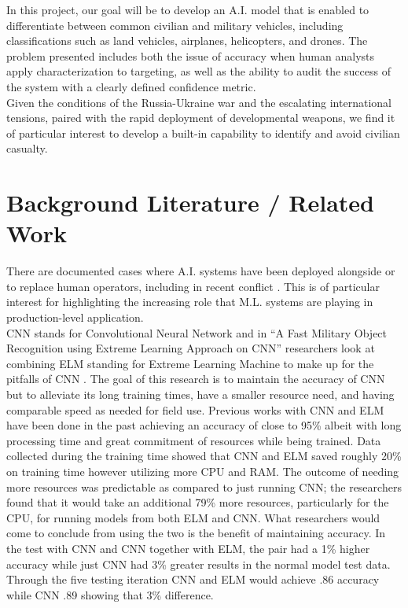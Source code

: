 \documentclass[12pt,twoside]{article}
\begin{document}
In this project, our goal will be to develop an A.I. model that is enabled to differentiate between common civilian and military vehicles, including classifications such as land vehicles, airplanes, helicopters, and drones. The problem presented includes both the issue of accuracy when human analysts apply characterization to targeting, as well as the ability to audit the success of the system with a clearly defined confidence metric.\\

Given the conditions of the Russia-Ukraine war and the escalating international tensions, paired with the rapid deployment of developmental weapons, we find it of particular interest to develop a built-in capability to identify and avoid civilian casualty. 

\newpage
\section{Background Literature / Related Work}
There are documented cases where A.I. systems have been deployed alongside or to replace human operators, including in recent conflict \cite{dronesAI}. This is of particular interest for highlighting the increasing role that M.L. systems are playing in production-level application.\\

CNN stands for Convolutional Neural Network and in ``A Fast Military Object Recognition using Extreme Learning Approach on CNN'' researchers look at combining ELM standing for Extreme Learning Machine to make up for the pitfalls of CNN \cite{CNN}. The goal of this research is to maintain the accuracy of CNN but to alleviate its long training times, have a smaller resource need, and having comparable speed as needed for field use. Previous works with CNN and ELM have been done in the past achieving an accuracy of close to 95\% albeit with long processing time and great commitment of resources while being trained. Data collected during the training time showed that CNN and ELM saved roughly 20\% on training time however utilizing more CPU and RAM. The outcome of needing more resources was predictable as compared to just running CNN; the researchers found that it would take an additional 79\% more resources, particularly for the CPU, for running models from both ELM and CNN. What researchers would come to conclude from using the two is the benefit of maintaining accuracy. In the test with CNN and CNN together with ELM, the pair had a 1\% higher accuracy while just CNN had 3\% greater results in the normal model test data. Through the five testing iteration CNN and ELM would achieve .86 accuracy while CNN .89 showing that 3\% difference.\\
\end{document}

